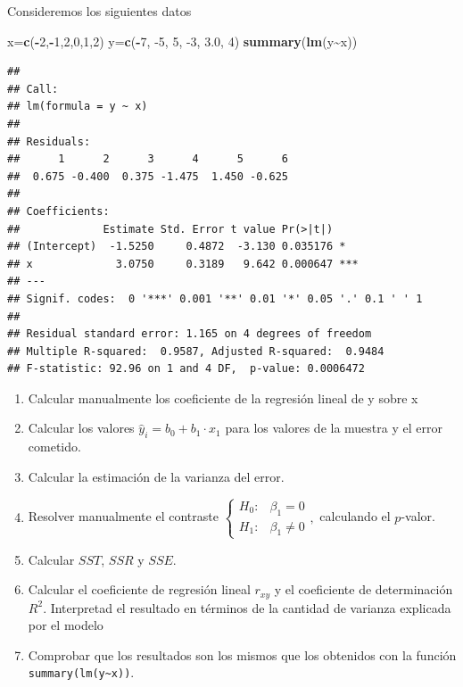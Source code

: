 \documentclass[
]{article}
\newenvironment{Shaded}{\begin{snugshade}}{\end{snugshade}}
\newcommand{\DecValTok}[1]{\textcolor[rgb]{0.00,0.00,0.81}{#1}}
\newcommand{\FloatTok}[1]{\textcolor[rgb]{0.00,0.00,0.81}{#1}}
\newcommand{\KeywordTok}[1]{\textcolor[rgb]{0.13,0.29,0.53}{\textbf{#1}}}
\newcommand{\NormalTok}[1]{#1}
\newcommand{\OperatorTok}[1]{\textcolor[rgb]{0.81,0.36,0.00}{\textbf{#1}}}
\providecommand{\tightlist}{%
  \setlength{\itemsep}{0pt}\setlength{\parskip}{0pt}}
\begin{document}
Consideremos los siguientes datos

\begin{Shaded}
\begin{Highlighting}[]
\NormalTok{x=}\KeywordTok{c}\NormalTok{(}\OperatorTok{{-}}\DecValTok{2}\NormalTok{,}\OperatorTok{{-}}\DecValTok{1}\NormalTok{,}\DecValTok{2}\NormalTok{,}\DecValTok{0}\NormalTok{,}\DecValTok{1}\NormalTok{,}\DecValTok{2}\NormalTok{)}
\NormalTok{y=}\KeywordTok{c}\NormalTok{(}\OperatorTok{{-}}\DecValTok{7}\NormalTok{, }\DecValTok{{-}5}\NormalTok{,  }\DecValTok{5}\NormalTok{, }\DecValTok{{-}3}\NormalTok{,  }\FloatTok{3.0}\NormalTok{,  }\DecValTok{4}\NormalTok{)}
\KeywordTok{summary}\NormalTok{(}\KeywordTok{lm}\NormalTok{(y}\OperatorTok{\textasciitilde{}}\NormalTok{x))}
\end{Highlighting}
\end{Shaded}

\begin{verbatim}
## 
## Call:
## lm(formula = y ~ x)
## 
## Residuals:
##      1      2      3      4      5      6 
##  0.675 -0.400  0.375 -1.475  1.450 -0.625 
## 
## Coefficients:
##             Estimate Std. Error t value Pr(>|t|)    
## (Intercept)  -1.5250     0.4872  -3.130 0.035176 *  
## x             3.0750     0.3189   9.642 0.000647 ***
## ---
## Signif. codes:  0 '***' 0.001 '**' 0.01 '*' 0.05 '.' 0.1 ' ' 1
## 
## Residual standard error: 1.165 on 4 degrees of freedom
## Multiple R-squared:  0.9587, Adjusted R-squared:  0.9484 
## F-statistic: 92.96 on 1 and 4 DF,  p-value: 0.0006472
\end{verbatim}

\begin{enumerate}
\def\labelenumi{\arabic{enumi}.}
\tightlist
\item
  Calcular manualmente los coeficiente de la regresión lineal de y sobre
  x
\item
  Calcular los valores \(\hat{y}_i=b_0+b_1\cdot x_1\) para los valores
  de la muestra y el error cometido.
\item
  Calcular la estimación de la varianza del error.
\item
  Resolver manualmente el contraste
  \(\left\{\begin{array}{ll} H_0: & \beta_1=0 \\ H_1: & \beta_1\not=0\end{array}\right. ,\)
  calculando el \(p\)-valor.
\item
  Calcular \(SST\), \(SSR\) y \(SSE\).
\item
  Calcular el coeficiente de regresión lineal \(r_{xy}\) y el
  coeficiente de determinación \(R^2\). Interpretad el resultado en
  términos de la cantidad de varianza explicada por el modelo
\item
  Comprobar que los resultados son los mismos que los obtenidos con la
  función \texttt{summary(lm(y\textasciitilde{}x))}.
\end{enumerate}
\end{document}
